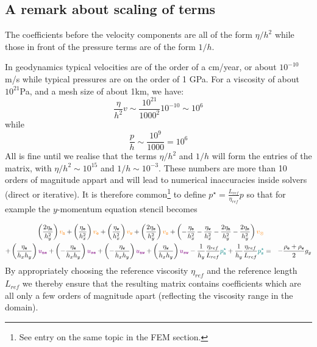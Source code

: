 \subsection{A remark about scaling of terms \label{ss:fdmstokesscaling}}

The coefficients before the velocity components are all of the form 
$\eta/h^2$ while those in front of the pressure terms are of the form 
$1/h$. 

In geodynamics typical velocities are of the order of a cm/year, or about 
$10^{-10}$ m/s
while typical pressures are on the order of 1 GPa.
For a viscosity of about $10^{21}$Pa, and a mesh size of about 1km, 
we have:
\[
\frac{\eta}{h^2} v \sim \frac{10^{21}}{1000^2} 10^{-10} \sim 10^6
\]
while
\[
\frac{p}{h} \sim \frac{10^9}{1000} = 10^6
\]
All is fine until we realise that the terms $\eta/h^2$ and $1/h$ 
will form the entries of the matrix, with 
$\eta/h^2 \sim 10^{15}$ and $1/h \sim 10^{-3}$. 
These numbers are more than 10 orders of magnitude appart and will lead to 
numerical inaccuracies inside solvers (direct or iterative). 
It is therefore common\footnote{See entry on the same topic
in the FEM section.} to define ${p}^\star=\frac{L_{ref}}{\eta_{ref}} p$ so that 
for example the $y$-momentum equation stencil becomes


\begin{eqnarray}
\left( \frac{2\eta_{\tt n}}{h_y^2} \right) {\color{orange} v_{\tt n}} +
\left( \frac{ \eta_{\tt e}}{h_x^2} \right) {\color{orange} v_{\tt e}} +
\left( \frac{ \eta_{\tt w}}{h_x^2} \right) {\color{orange} v_{\tt w}} +
\left( \frac{2\eta_{\tt s}}{h_y^2} \right) {\color{orange} v_{\tt s}} +
\left( 
-\frac{\eta_{\tt e}}{h_x^2} 
-\frac{\eta_{\tt w}}{h_x^2} 
-\frac{2\eta_{\tt n}}{h_y^2} 
-\frac{2\eta_{\tt s}}{h_y^2} 
\right) {\color{orange} v_\otimes} \nonumber\\
+
\left( \frac{\eta_{\tt e}}{h_x h_y} \right) {\color{violet} u_{\tt ne}} +
\left(-\frac{\eta_{\tt e}}{h_x h_y} \right) {\color{violet} u_{\tt se}} +
\left(-\frac{\eta_{\tt w}}{h_x h_y} \right) {\color{violet} u_{\tt nw}} +
\left( \frac{\eta_{\tt w}}{h_x h_y} \right) {\color{violet} u_{\tt sw}} 
-\frac{1}{h_y}\frac{\eta_{ref}}{L_{ref}} {\color{teal} {p}_{\tt n}^\star} 
+\frac{1}{h_y}\frac{\eta_{ref}}{L_{ref}} {\color{teal} {p}_{\tt s}^\star}
&=& -\frac{\rho_{\tt e}+\rho_{\tt w}}{2} g_y \nonumber
\end{eqnarray}
By appropriately choosing the reference viscosity $\eta_{ref}$ and the reference
length $L_{ref}$ we thereby ensure that the 
resulting matrix contains coefficients which are all only a 
few orders of magnitude apart (reflecting the viscosity range in the domain).

